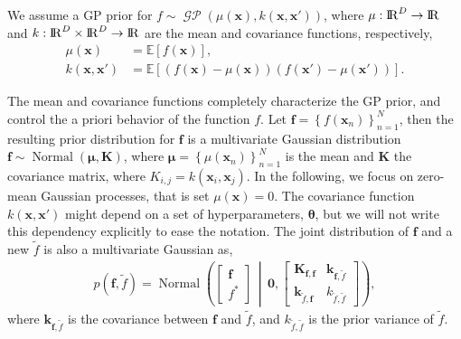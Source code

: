 \documentclass[onecolumn,a4paper,11pt]{article}
\DeclareMathOperator{\GP}{\mathcal{GP}}
\DeclareMathOperator{\Normal}{Normal}
\begin{document}
We assume a GP prior for $f \sim \GP(\mu(\bm{x}), k(\bm{x}, \bm{x}'))$, where $\mu: {\rm I\!R}^D \to {\rm I\!R}$ and $k: {\rm I\!R}^D \times {\rm I\!R}^D \to {\rm I\!R}$ are the mean and covariance functions, respectively,
%
\begin{align*}
 	\mu(\bm{x}) &= \mathbb{E}\!\left[f(\bm{x})\right],\\ 
 	k(\bm{x}, \bm{x}') &= \mathbb{E}\!\left[\left( f(\bm{x}) - \mu(\bm{x}) \right)\left( f(\bm{x}') - \mu(\bm{x}') \right)\right].
\end{align*} 

The mean and covariance functions completely characterize the GP prior, and control the a priori behavior of the function $f$. Let $\bm{f}=\left\lbrace f(\bm{x}_n) \right\rbrace_{n=1}^N$, then the resulting prior distribution for $\bm{f}$ is a multivariate Gaussian distribution $\bm{f} \sim \Normal(\bm{\mu}, \bm{K})$, where $\bm{\mu} = \left\lbrace \mu(\bm{x}_n) \right\rbrace_{n=1}^N$ is the mean and $\bm{K}$ the covariance matrix, where $K_{i,j}=k(\bm{x}_i,\bm{x}_j)$. In the following, we focus on zero-mean Gaussian processes, that is set $\mu(\bm{x}) = 0$. The covariance function $k(\bm{x}, \bm{x}')$ might depend on a set of hyperparameters, $\bm{\theta}$, but we will not write this dependency explicitly to ease the notation. The joint distribution of $\bm{f}$ and a new $\tilde{f}$ is also a multivariate Gaussian as,
%
\begin{align*}
p(\bm{f}, \tilde{f})=\Normal \left( \left[ \begin{array}{cc}
\bm{f} \\ 
f^*
\end{array} \right] \,\middle|\, \bm{0},\left[ \begin{array}{cc}
\bm{K}_{\bm{f},\bm{f}} & \bm{k}_{\bm{f},\tilde{f}} \\ 
\bm{k}_{\tilde{f},\bm{f}} & k_{\tilde{f},\tilde{f}}
\end{array} \right] \right),
\end{align*}
%
where $\bm{k}_{\bm{f},\tilde{f}}$ is the covariance between $\bm{f}$ and $\tilde{f}$, and $k_{\tilde{f},\tilde{f}}$ is the prior variance of $\tilde{f}$. %
\end{document}
